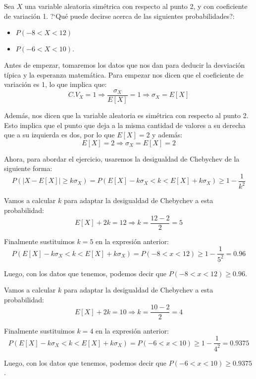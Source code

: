 \problem

Sea $X$ una variable aleatoria sim{\'e}trica con respecto al
punto 2, y con coeficiente de variaci{\'o}n 1. ?`Qu{\'e} puede decirse acerca de las
siguientes probabilidades?:
\begin{itemize}
\item $P(-8<X<12)$
\item $P(-6<X<10).$
\end{itemize}

Antes de empezar, tomaremos los datos que nos dan para deducir la desviación típica y la esperanza matemática. Para empezar nos dicen que el coeficiente de variación es 1, lo que implica que:
\begin{equation*}
    C.V_X = 1 \Rightarrow \dfrac{\sigma_X}{E[X]} = 1 \Rightarrow \sigma_X = E[X]
\end{equation*}

Además, nos dicen que la variable aleatoria es simétrica con respecto al punto 2. Esto implica que el punto que deja a la misma cantidad de valores a su derecha que a su izquierda es dos, por lo que $E[X] = 2$ y además:
\begin{equation*}
    E[X] = 2 \Rightarrow \sigma_X = E[X] = 2
\end{equation*}

Ahora, para abordar el ejercicio, usaremos la desigualdad de Chebychev de la siguiente forma:
\begin{equation*}
    P(|X-E[X]| \geq k \sigma_X) = P(E[X] - k\sigma_X < k < E[X] + k\sigma_X) \geq 1 - \dfrac{1}{k^2}
\end{equation*}

\subproblem

Vamos a calcular $k$ para adaptar la desigualdad de Chebychev a esta probabilidad:
\begin{equation*}
    E[X] + 2k = 12 \Rightarrow k = \dfrac{12-2}{2} = 5
\end{equation*}

Finalmente sustituimos $k=5$ en la expresión anterior:
\begin{equation*}
    P(E[X] - k\sigma_X < k < E[X] + k\sigma_X) = P(-8 < x < 12) \geq 1 - \dfrac{1}{5^2} = 0.96
\end{equation*}

Luego, con los datos que tenemos, podemos decir que $P(-8 < x < 12) \geq 0.96$.

\subproblem

Vamos a calcular $k$ para adaptar la desigualdad de Chebychev a esta probabilidad:
\begin{equation*}
    E[X] + 2k = 10 \Rightarrow k = \dfrac{10-2}{2} = 4
\end{equation*}

Finalmente sustituimos $k=4$ en la expresión anterior:
\begin{equation*}
    P(E[X] - k\sigma_X < k < E[X] + k\sigma_X) = P(-6 < x < 10) \geq 1 - \dfrac{1}{4^2} = 0.9375
\end{equation*}

Luego, con los datos que tenemos, podemos decir que $P(-6 < x < 10) \geq 0.9375$.
